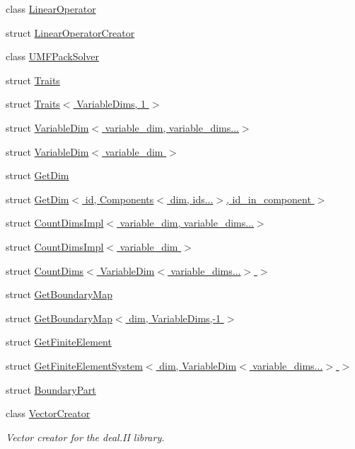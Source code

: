 \begin{DoxyCompactItemize}
\item 
class \hyperlink{classSpacy_1_1dealII_1_1LinearOperator}{\-Linear\-Operator}
\item 
struct \hyperlink{structSpacy_1_1dealII_1_1LinearOperatorCreator}{\-Linear\-Operator\-Creator}
\item 
class \hyperlink{classSpacy_1_1dealII_1_1UMFPackSolver}{\-U\-M\-F\-Pack\-Solver}
\item 
struct \hyperlink{structSpacy_1_1dealII_1_1Traits}{\-Traits}
\item 
struct \hyperlink{structSpacy_1_1dealII_1_1Traits_3_01VariableDims_00_011_01_4}{\-Traits$<$ Variable\-Dims, 1 $>$}
\item 
struct \hyperlink{structSpacy_1_1dealII_1_1VariableDim_3_01variable__dim_00_01variable__dims_8_8_8_4}{\-Variable\-Dim$<$ variable\-\_\-dim, variable\-\_\-dims...$>$}
\item 
struct \hyperlink{structSpacy_1_1dealII_1_1VariableDim_3_01variable__dim_01_4}{\-Variable\-Dim$<$ variable\-\_\-dim $>$}
\item 
struct \hyperlink{structSpacy_1_1dealII_1_1GetDim}{\-Get\-Dim}
\item 
struct \hyperlink{structSpacy_1_1dealII_1_1GetDim_3_01id_00_01Components_3_01dim_00_01ids_8_8_8_4_00_01id__in__component_01_4}{\-Get\-Dim$<$ id, Components$<$ dim, ids...$>$, id\-\_\-in\-\_\-component $>$}
\item 
struct \hyperlink{structSpacy_1_1dealII_1_1CountDimsImpl_3_01variable__dim_00_01variable__dims_8_8_8_4}{\-Count\-Dims\-Impl$<$ variable\-\_\-dim, variable\-\_\-dims...$>$}
\item 
struct \hyperlink{structSpacy_1_1dealII_1_1CountDimsImpl_3_01variable__dim_01_4}{\-Count\-Dims\-Impl$<$ variable\-\_\-dim $>$}
\item 
struct \hyperlink{structSpacy_1_1dealII_1_1CountDims_3_01VariableDim_3_01variable__dims_8_8_8_4_01_4}{\-Count\-Dims$<$ Variable\-Dim$<$ variable\-\_\-dims...$>$ $>$}
\item 
struct \hyperlink{structSpacy_1_1dealII_1_1GetBoundaryMap}{\-Get\-Boundary\-Map}
\item 
struct \hyperlink{structSpacy_1_1dealII_1_1GetBoundaryMap_3_01dim_00_01VariableDims_00-1_01_4}{\-Get\-Boundary\-Map$<$ dim, Variable\-Dims,-\/1 $>$}
\item 
struct \hyperlink{structSpacy_1_1dealII_1_1GetFiniteElement}{\-Get\-Finite\-Element}
\item 
struct \hyperlink{structSpacy_1_1dealII_1_1GetFiniteElementSystem_3_01dim_00_01VariableDim_3_01variable__dims_8_8_8_4_01_4}{\-Get\-Finite\-Element\-System$<$ dim, Variable\-Dim$<$ variable\-\_\-dims...$>$ $>$}
\item 
struct \hyperlink{structSpacy_1_1dealII_1_1BoundaryPart}{\-Boundary\-Part}
\item 
class \hyperlink{classSpacy_1_1dealII_1_1VectorCreator}{\-Vector\-Creator}
\begin{DoxyCompactList}\small\item\em \-Vector creator for the deal.\-I\-I library. \end{DoxyCompactList}\end{DoxyCompactItemize}
